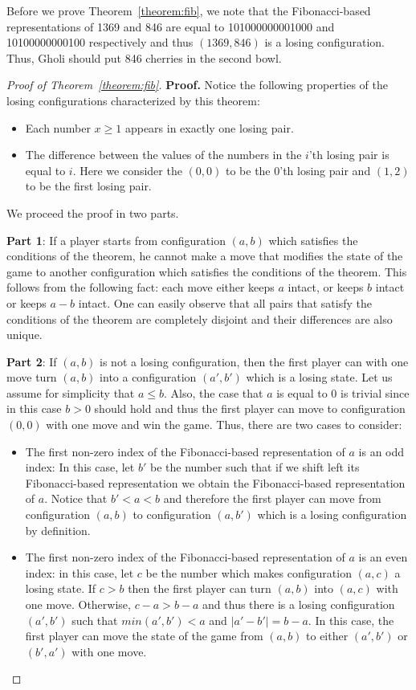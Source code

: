 \begin{solution}
Before we prove Theorem~\ref{theorem:fib}, we note that the Fibonacci-based representations of 1369 and 846 are equal to 101000000001000 and 10100000000100 respectively and thus $(1369,846)$ is a losing configuration. Thus, Gholi should put 846 cherries in the second bowl.

\begin{proof}[Proof of Theorem~\ref{theorem:fib}]
\textbf{Proof. }
	Notice the following properties of the losing configurations characterized by this theorem:
	\begin{itemize}
		\item Each number $x \geq 1$ appears in exactly one losing pair.
		\item The difference between the values of the numbers in the $i$'th losing pair is equal to $i$. Here we consider the $(0,0)$ to be the 0'th losing pair and $(1,2)$ to be the first losing pair.
	\end{itemize}
	
	We proceed the proof in two parts.
	
	\textbf{Part 1}: If a player starts from configuration $(a, b)$ which satisfies the conditions of the theorem, he cannot make a move that modifies the state of the game to another configuration which satisfies the conditions of the theorem. This follows from the following fact: each move either keeps $a$ intact, or keeps $b$ intact or keeps $a-b$ intact. One can easily observe that all pairs that satisfy the conditions of the theorem are completely disjoint and their differences are also unique.
	
	\textbf{Part 2}: If $(a,b)$ is not a losing configuration, then the first player can with one move turn $(a,b)$ into a configuration $(a',b')$ which is a losing state. Let us assume for simplicity that $a \leq b$. Also, the case that $a$ is equal to 0 is trivial since in this case $b > 0$ should hold and thus the first player can move to configuration $(0,0)$ with one move and win the game. Thus, there are two cases to consider:
	\begin{itemize}
		\item The first non-zero index of the Fibonacci-based representation of $a$ is an odd index: In this case, let $b'$ be the number such that if we shift left its Fibonacci-based representation we obtain the Fibonacci-based representation of $a$. Notice that $b' < a < b$ and therefore the first player can move from configuration $(a,b)$ to configuration $(a,b')$ which is a losing configuration by definition.
		\item The first non-zero index of the Fibonacci-based representation of $a$ is an even index: in this case, let $c$ be the number which makes configuration $(a,c)$ a losing state. If $c > b$ then the first player can turn $(a,b)$ into $(a,c)$ with one move. Otherwise, $c-a > b-a$ and thus there is a losing configuration $(a',b')$ such that $min(a',b') < a$ and $|a'-b'| = b-a$. In this case, the first player can move the state of the game from $(a,b)$ to either $(a',b')$ or $(b',a')$ with one move.
	\end{itemize}
	
\end{proof}
\end{solution}

